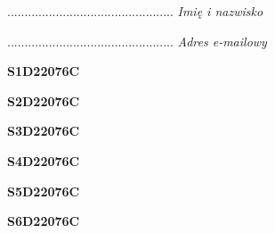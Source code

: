 \begin{turn}{90}\begin{minipage}{\linewidth} \vspace{20mm} ................................................  \textit{Imię i nazwisko}\end{minipage}\end{turn}

\begin{turn}{90}\begin{minipage}{\linewidth} \vspace{20mm} ................................................  \textit{Adres e-mailowy}\end{minipage}\end{turn}

\begin{turn}{90}\huge \begin{minipage}{\linewidth} \vspace{10mm}\textbf{S1D22076C}\end{minipage}\end{turn}

\begin{turn}{90}\huge \begin{minipage}{\linewidth} \vspace{10mm}\textbf{S2D22076C}\end{minipage}\end{turn}

\begin{turn}{90}\huge \begin{minipage}{\linewidth} \vspace{10mm}\textbf{S3D22076C}\end{minipage}\end{turn}

\begin{turn}{90}\huge \begin{minipage}{\linewidth} \vspace{10mm}\textbf{S4D22076C}\end{minipage}\end{turn}

\begin{turn}{90}\huge \begin{minipage}{\linewidth} \vspace{10mm}\textbf{S5D22076C}\end{minipage}\end{turn}

\begin{turn}{90}\huge \begin{minipage}{\linewidth} \vspace{10mm}\textbf{S6D22076C}\end{minipage}\end{turn}

